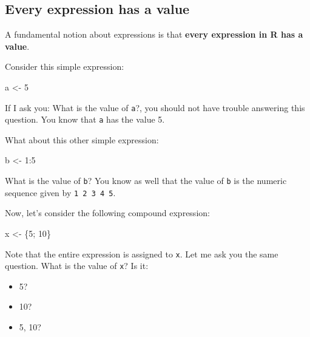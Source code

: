 \documentclass[
]{book}
\newenvironment{Shaded}{\begin{snugshade}}{\end{snugshade}}
\newcommand{\DecValTok}[1]{\textcolor[rgb]{0.00,0.00,0.81}{#1}}
\newcommand{\NormalTok}[1]{#1}
\newcommand{\OtherTok}[1]{\textcolor[rgb]{0.56,0.35,0.01}{#1}}
\newcommand{\SpecialCharTok}[1]{\textcolor[rgb]{0.00,0.00,0.00}{#1}}
\providecommand{\tightlist}{%
  \setlength{\itemsep}{0pt}\setlength{\parskip}{0pt}}
\begin{document}
\hypertarget{every-expression-has-a-value}{%
\subsection{Every expression has a value}\label{every-expression-has-a-value}}

A fundamental notion about expressions is that
\textbf{every expression in R has a value}.

Consider this simple expression:

\begin{Shaded}
\begin{Highlighting}[]
\NormalTok{a }\OtherTok{\textless{}{-}} \DecValTok{5}
\end{Highlighting}
\end{Shaded}

If I ask you: What is the value of \texttt{a}?, you should not have trouble answering
this question. You know that \texttt{a} has the value 5.

What about this other simple expression:

\begin{Shaded}
\begin{Highlighting}[]
\NormalTok{b }\OtherTok{\textless{}{-}} \DecValTok{1}\SpecialCharTok{:}\DecValTok{5}
\end{Highlighting}
\end{Shaded}

What is the value of \texttt{b}? You know as well that the value of \texttt{b} is the
numeric sequence given by \texttt{1\ 2\ 3\ 4\ 5}.

Now, let's consider the following compound expression:

\begin{Shaded}
\begin{Highlighting}[]
\NormalTok{x }\OtherTok{\textless{}{-}}\NormalTok{ \{}\DecValTok{5}\NormalTok{; }\DecValTok{10}\NormalTok{\}}
\end{Highlighting}
\end{Shaded}

Note that the entire expression is assigned to \texttt{x}. Let me ask you the same
question. What is the value of \texttt{x}? Is it:

\begin{itemize}
\tightlist
\item
  5?
\item
  10?
\item
  5, 10?
\end{itemize}
\end{document}
